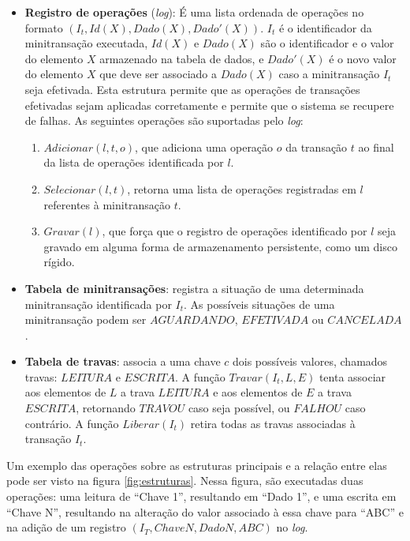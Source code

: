 \documentclass[11pt,twoside,a4paper]{book}
\begin{document}
\begin{itemize}
    \item \textbf{Registro de operações} (\emph{log}): É uma lista ordenada de operações no formato $(I_t, Id(X), Dado(X), Dado'(X))$. $I_t$ é o identificador da minitransação executada, $Id(X)$ e $Dado(X)$ são o identificador e o valor do elemento $X$ armazenado na tabela de dados, e $Dado'(X)$ é o novo valor do elemento $X$ que deve ser associado a $Dado(X)$ caso a minitransação $I_t$ seja efetivada. Esta estrutura permite que as operações de transações efetivadas sejam aplicadas corretamente e permite que o sistema se recupere de falhas. As seguintes operações são suportadas pelo \emph{log}:

        \begin{enumerate}
            \item $Adicionar(l, t, o)$, que adiciona uma operação $o$ da transação $t$ ao final da lista de operações identificada por $l$.

            \item $Selecionar(l, t)$, retorna uma lista de operações registradas em $l$ referentes à minitransação $t$.

            \item $Gravar(l)$, que força que o registro de operações identificado por $l$ seja gravado em alguma forma de armazenamento persistente, como um disco rígido.
        \end{enumerate}

    \item \textbf{Tabela de minitransações}: registra a situação de uma determinada minitransação identificada por $I_t$. As possíveis situações de uma minitransação podem ser $AGUARDANDO$, $EFETIVADA$ ou $CANCELADA$.

    \item \textbf{Tabela de travas}: associa a uma chave $c$ dois possíveis valores, chamados travas: $LEITURA$ e $ESCRITA$. A função $Travar(I_t, L, E)$ tenta associar aos elementos de $L$ a trava $LEITURA$ e aos elementos de $E$ a trava $ESCRITA$, retornando $TRAVOU$ caso seja possível, ou $FALHOU$ caso contrário. A função $Liberar(I_t)$ retira todas as travas associadas à transação $I_t$.
\end{itemize}

Um exemplo das operações sobre as estruturas principais e a relação entre elas pode ser visto na figura \ref{fig:estruturas}. Nessa figura, são executadas duas operações: uma leitura de ``Chave 1'', resultando em ``Dado 1'', e uma escrita em ``Chave N'', resultando na alteração do valor associado à essa chave para ``ABC'' e na adição de um registro $(I_T, Chave N, Dado N, ABC)$ no \emph{log}.
\end{document}
